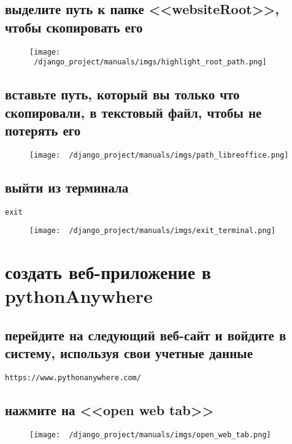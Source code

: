 \documentclass[12pt]{article}
\begin{document}
    \subsection{выделите путь к папке <<websiteRoot>>, чтобы скопировать его}
	\begin{figure}[H]
		\centering
		\texttt{[image: ~/django\_project/manuals/imgs/highlight\_root\_path.png]}
		\caption{}
	\end{figure}
  \subsection{вставьте путь, который вы только что скопировали, в текстовый файл, чтобы не потерять его}
	\begin{figure}[H]
		\centering
		\texttt{[image: ~/django\_project/manuals/imgs/path\_libreoffice.png]}
		\caption{}
	\end{figure}
    \subsection{ выйти из терминала}
			\begin{lstlisting}[caption=\phantom{},style=conlst,label={lst:enter_desktop}]
      exit
			\end{lstlisting}
	\begin{figure}[H]
		\centering
		\texttt{[image: ~/django\_project/manuals/imgs/exit\_terminal.png]}
		\caption{}
	\end{figure}
\section{создать веб-приложение в pythonAnywhere}
    \subsection{ перейдите на следующий веб-сайт и войдите в систему, используя свои учетные данные}
      \begin{lstlisting}[caption=\phantom{},style=conlst,label={lst:enter_desktop}]
      https://www.pythonanywhere.com/
			\end{lstlisting}
    \subsection{нажмите на <<open web tab>>}
	\begin{figure}[H]
		\centering
		\texttt{[image: ~/django\_project/manuals/imgs/open\_web\_tab.png]}
		\caption{}
	\end{figure}
\end{document}
